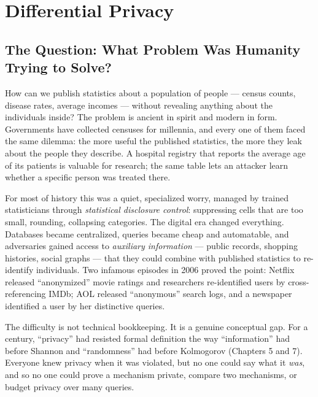 
\chapter{Differential Privacy}
\label{ch:dp}

\section{The Question: What Problem Was Humanity Trying to Solve?}
\label{sec:dp:question}

How can we publish statistics about a population of people --- census counts, disease rates, average incomes --- without revealing anything about the individuals inside? The problem is ancient in spirit and modern in form. Governments have collected censuses for millennia, and every one of them faced the same dilemma: the more useful the published statistics, the more they leak about the people they describe. A hospital registry that reports the average age of its patients is valuable for research; the same table lets an attacker learn whether a specific person was treated there.

For most of history this was a quiet, specialized worry, managed by trained statisticians through \emph{statistical disclosure control}: suppressing cells that are too small, rounding, collapsing categories. The digital era changed everything. Databases became centralized, queries became cheap and automatable, and adversaries gained access to \emph{auxiliary information} --- public records, shopping histories, social graphs --- that they could combine with published statistics to re-identify individuals. Two infamous episodes in 2006 proved the point: Netflix released ``anonymized'' movie ratings and researchers re-identified users by cross-referencing IMDb; AOL released ``anonymous'' search logs, and a newspaper identified a user by her distinctive queries.  

The difficulty is not technical bookkeeping. It is a genuine conceptual gap. For a century, ``privacy'' had resisted formal definition the way ``information'' had before Shannon and ``randomness'' had before Kolmogorov (Chapters 5 and 7). Everyone knew privacy when it was violated, but no one could say what it \emph{was}, and so no one could prove a mechanism private, compare two mechanisms, or budget privacy over many queries. 

